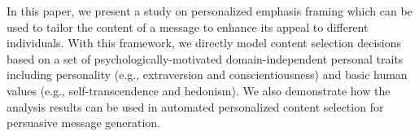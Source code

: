 In this paper, we present a study on personalized emphasis framing which can be used to tailor the content of a message to enhance its appeal to different individuals. With this framework, we directly model content selection decisions based on a set of psychologically-motivated domain-independent personal traits including personality (e.g., extraversion and conscientiousness)  and basic human values (e.g.,  self-transcendence and hedonism). We also demonstrate how the analysis results can be used in automated personalized content selection for persuasive message generation.
